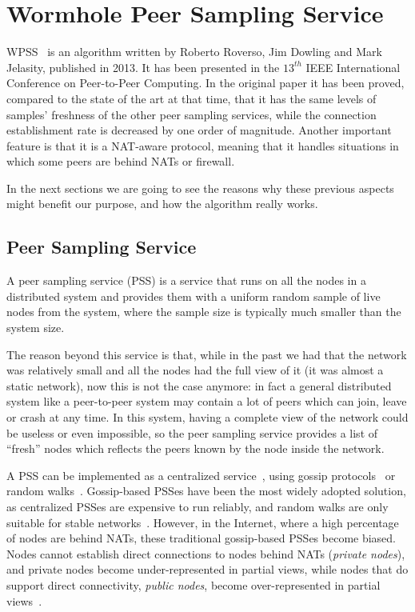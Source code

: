 
\chapter{Wormhole Peer Sampling Service}
\label{cha:wormhole}
\ac{WPSS}~\cite{wormhole} is an algorithm written by Roberto Roverso, Jim Dowling and Mark Jelasity, published in 2013. It has been presented in the $13^{th}$ IEEE International Conference on Peer-to-Peer Computing. In the original paper it has been proved, compared to the state of the art at that time, that it has the same levels of samples' freshness  of the other peer sampling services, while the connection establishment rate is decreased by one order of magnitude. Another important feature is that it is a NAT-aware protocol, meaning that it handles situations in which some peers are behind NATs or firewall.

In the next sections we are going to see the reasons why these previous aspects might benefit our purpose, and how the algorithm really works.

\section{Peer Sampling Service}
\label{sec:pss}
A peer sampling service (PSS) is a service that runs on all the nodes in a distributed system and provides them with a uniform random sample of live nodes from the system, where the sample size is typically much smaller than the system size. 

The reason beyond this service is that, while in the past we had that the network was relatively small and all the nodes had the full view of it (it was almost a static network), now this is not the case anymore: in fact a general distributed system like a peer-to-peer system may contain a lot of peers which can join, leave or crash at any time. In this system, having a complete view of the network could be useless or even impossible, so the peer sampling service provides a list of ``fresh'' nodes which reflects the peers known by the node inside the network.

A PSS can be implemented as a centralized service~\cite{spotify}, using gossip protocols~\cite{gossip_protocol} or random walks~\cite{rw}. Gossip-based PSSes have been the most widely adopted solution, as centralized PSSes are expensive to run reliably, and random walks are only suitable for stable networks~\cite{rw}. However, in the Internet, where a high percentage of nodes are behind NATs, these traditional gossip-based PSSes become biased. Nodes cannot establish direct connections to nodes behind NATs (\emph{private nodes}), and private nodes become under-represented in partial views, while nodes that do support direct connectivity, \emph{public nodes}, become over-represented in partial views~\cite{gozar}. 

